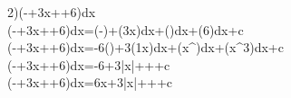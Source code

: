 2)\int\left(-+\dfrac3x++6\right)dx
\\\int\left(-+\dfrac3x++6\right)dx=\int\left(-\right)+\int\left(\dfrac3x\right)dx+\int\left(\right)dx+\int\left(6\right)dx+c
\\\int\left(-+\dfrac3x++6\right)dx=-6\int\left(\right)+3\int\left(\dfrac1x\right)dx+\int\left(x^{}\right)dx+\int\left(x^3\right)dx+c
\\\int\left(-+\dfrac3x++6\right)dx=-6\cdot{}+3\ln|x|+++c
\\\int\left(-+\dfrac3x++6\right)dx=\dfrac6x+3\ln|x|+++c